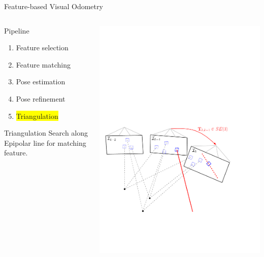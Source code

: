 \documentclass[10pt]{beamer}
\begin{document}
\begin{frame}{Feature-based Visual Odometry}
	\begin{columns}
	  \begin{column}{0.4\textwidth}
	  	\begin{block}{Pipeline}
		  	\begin{enumerate}
				\item Feature selection
				\item Feature matching
				\item Pose estimation
				\item Pose refinement
				\item \colorbox{yellow}{Triangulation}
			\end{enumerate}
		\end{block}
		\begin{block}{Triangulation}
			Search along Epipolar line for matching feature.
		\end{block}
	  \end{column}
	  \begin{column}{0.6\textwidth}
	    \includegraphics[width=\textwidth]{img/vo_pipeline_7}
	  \end{column}
	\end{columns}
\end{frame}
\end{document}
